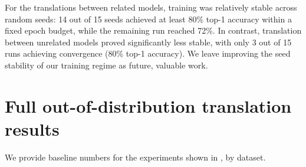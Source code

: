 For the translations between related models, \atk{} training was relatively stable across random seeds: 14 out of 15 seeds achieved at least 80\% top-1 accuracy within a fixed epoch budget, while the remaining run reached 72\%. In contrast, translation between unrelated models proved significantly less stable, with only 3 out of 15 runs achieving convergence (80\% top-1 accuracy). We leave improving the seed stability of our training regime as future, valuable work.


\section{Full out-of-distribution translation results}
\label{sec:full_ood}
We provide baseline numbers for the experiments shown in , by dataset.
